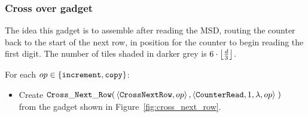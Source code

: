 
\subsubsection{Cross over gadget}

The idea this gadget is to assemble after reading the MSD, routing the counter back to the start of the
next row, in position for the counter to begin reading the first digit.
The number of tiles shaded in darker grey is $6 \cdot \floor*{\frac{d}{3}}$.

\vspace{.5cm}
For each $\inc\in \{ {\tt increment}, {\tt copy} \}$:

\begin{itemize}
    \item Create
    $\begin{aligned}[t]
        {\tt Cross\_Next\_Row}(&\left\langle {\tt CrossNextRow},            \inc \right\rangle,
                                \left\langle {\tt CounterRead},        1, \lambda, \inc \right\rangle \;)
    \end{aligned}$\\from the gadget shown in Figure~\ref{fig:cross_next_row}.
\end{itemize}


